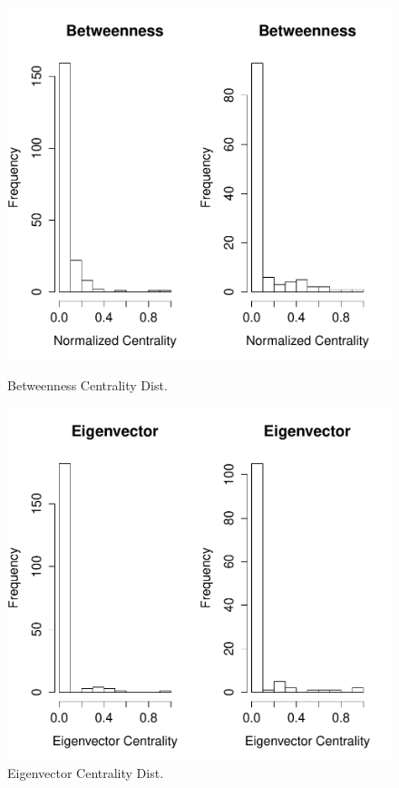 \documentclass[12pt]{article} %
\numberwithin{equation}{section}		%
\numberwithin{figure}{section}			%
\numberwithin{table}{section}				%
\begin{document}
\begin{figure}[!ht]
\centering
\begin{minipage}{.45\textwidth}
\centering
      \includegraphics[width=\linewidth]{betweennessPlot.pdf}
      \caption{Betweenness Centrality Dist.}\label{fig:x3}
\end{minipage}
\begin{minipage}{.45\textwidth}
\centering
\includegraphics[width=\linewidth]{eigenvectorPlot.pdf}
      \caption{Eigenvector Centrality Dist.}\label{fig:x4}
      \end{minipage}
\end{figure}
\end{document}
